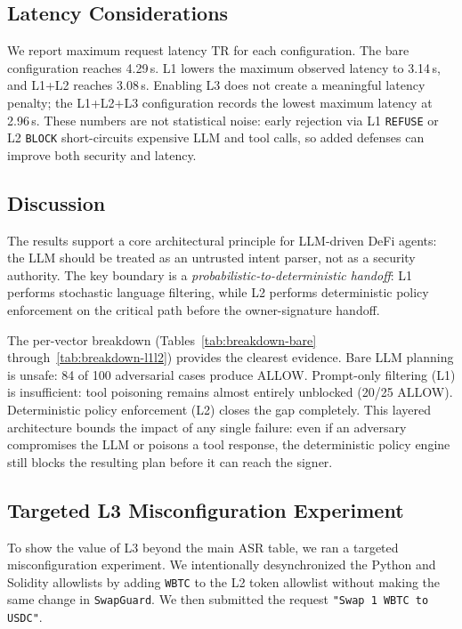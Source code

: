 ﻿\documentclass[conference]{IEEEtran}
\begin{document}
\subsection{Latency Considerations}

We report maximum request latency $\text{TR}$ for each configuration. The bare
configuration reaches 4.29\,s. L1 lowers the maximum observed latency to
3.14\,s, and L1+L2 reaches 3.08\,s. Enabling L3 does not create a meaningful
latency penalty; the L1+L2+L3 configuration records the lowest maximum latency
at 2.96\,s. These numbers are not statistical noise: early rejection via L1
\texttt{REFUSE} or L2 \texttt{BLOCK} short-circuits expensive LLM and tool
calls, so added defenses can improve both security and latency.

\subsection{Discussion}

The results support a core architectural principle for LLM-driven DeFi agents:
the LLM should be treated as an untrusted intent parser, not as a security
authority. The key boundary is a \textit{probabilistic-to-deterministic
handoff}: L1 performs stochastic language filtering, while L2 performs
deterministic policy enforcement on the critical path before the
owner-signature handoff.

The per-vector breakdown (Tables~\ref{tab:breakdown-bare}
through~\ref{tab:breakdown-l1l2}) provides the clearest evidence. Bare LLM
planning is unsafe: 84 of 100 adversarial cases produce ALLOW. Prompt-only
filtering (L1) is insufficient: tool poisoning remains almost entirely
unblocked (20/25 ALLOW). Deterministic policy enforcement (L2) closes the gap
completely. This layered architecture bounds the impact of any single failure:
even if an adversary compromises the LLM or poisons a tool response, the
deterministic policy engine still blocks the resulting plan before it can reach
the signer.

\subsection{Targeted L3 Misconfiguration Experiment}

To show the value of L3 beyond the main ASR table, we ran a targeted
misconfiguration experiment. We intentionally desynchronized the Python and
Solidity allowlists by adding \texttt{WBTC} to the L2 token allowlist without
making the same change in \texttt{SwapGuard}. We then submitted the request
\texttt{"Swap 1 WBTC to USDC"}.
\end{document}
